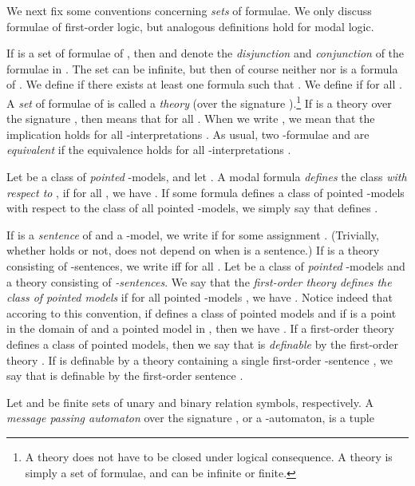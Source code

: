 \documentclass[copyright,creativecommons]{eptcs}
\begin{document}
We next fix some conventions concerning \emph{sets}
of formulae. We only discuss formulae of first-order logic,
but analogous definitions hold for modal logic.




If  is a set of formulae of ,
then  and  denote the \emph{disjunction} and
\emph{conjunction} of the formulae in . The set  can be infinite, but 
then of course neither  nor  is a formula of 
.
We define  if there exists at least one formula  such that .
We define  if  for all .
A \emph{set} of formulae of 
is called a \emph{theory} (over the
signature ).\hspace{0.4mm}\footnote{A theory does not have to be closed under
logical consequence. A theory is simply a set of formulae, and
can be infinite or finite.} If  is a theory over the signature ,
then  means that  for all .
When we write , we mean that
the implication  holds
for all -interpretations .
As usual, two -formulae  and 
are \emph{equivalent} if the equivalence  holds
for all -interpretations .




Let  be a class of \emph{pointed} -models, and let .
A modal formula  \emph{defines} the class  \emph{with respect to} , if
for all , we have .
If some formula  defines a class  of pointed -models with respect to the
class of all pointed -models, we simply say that  defines .




If  is a \emph{sentence} of  
and  a -model,
we write  if 
for some assignment . (Trivially, whether  holds or not, does not
depend on  when  is a sentence.)
If  is a theory consisting of -sentences,
we write  iff  for all .
Let  be a class of \emph{pointed} -models
and  a theory consisting of \emph{-sentences}.
We say that the \emph{first-order theory  defines the class 
of pointed models} if for all pointed -models , we have
.
Notice indeed that accoring to this convention, if 
defines a class  of pointed models
and if  is a point in
the domain of  and  a pointed model in , then
we have .
If a first-order theory  defines a class  of pointed models,
then we say that  is \emph{definable} by
the first-order theory .
If  is definable by a theory  containing a
single first-order -sentence , we say that 
is definable by the first-order sentence .




Let  and  be finite sets of unary and
binary relation symbols, respectively.
A \emph{message passing automaton}  over the signature 
, or a -automaton,
is a tuple
\end{document}

